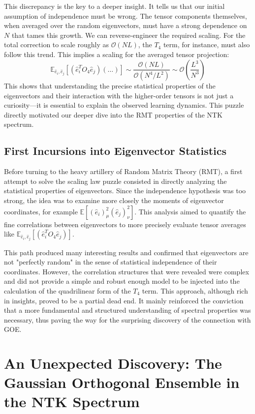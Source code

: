 \documentclass{article}
\newcommand{\Order}{\mathcal{O}}
\begin{document}
This discrepancy is the key to a deeper insight. It tells us that our initial assumption of independence must be wrong. The tensor components themselves, when averaged over the random eigenvectors, must have a strong dependence on $N$ that tames this growth. We can reverse-engineer the required scaling. For the total correction to scale roughly as $\Order(NL)$, the $T_4$ term, for instance, must also follow this trend. This implies a scaling for the averaged tensor projection:
\[ \mathbb{E}_{\hat{e}_i, \hat{e}_j}[(\hat{e}_{i}^{T}O_{4}\hat{e}_{j})(\dots)] \sim \frac{\Order(NL)}{\Order(N^4/L^2)} \sim \Order\left(\frac{L^3}{N^3}\right) \]
This shows that understanding the precise statistical properties of the eigenvectors and their interaction with the higher-order tensors is not just a curiosity—it is essential to explain the observed learning dynamics. This puzzle directly motivated our deeper dive into the RMT properties of the NTK spectrum.

\subsection{First Incursions into Eigenvector Statistics}

Before turning to the heavy artillery of Random Matrix Theory (RMT), a first attempt to solve the scaling law puzzle consisted in directly analyzing the statistical properties of eigenvectors. Since the independence hypothesis was too strong, the idea was to examine more closely the moments of eigenvector coordinates, for example $\mathbb{E}[(\hat{e}_i)_\mu^2 (\hat{e}_j)_\nu^2]$. This analysis aimed to quantify the fine correlations between eigenvectors to more precisely evaluate tensor averages like $\mathbb{E}_{\hat{e}_i, \hat{e}_j}[(\hat{e}_{i}^{T}O_{4}\hat{e}_{j})]$.

This path produced many interesting results and confirmed that eigenvectors are not "perfectly random" in the sense of statistical independence of their coordinates. However, the correlation structures that were revealed were complex and did not provide a simple and robust enough model to be injected into the calculation of the quadrilinear form of the $T_4$ term. This approach, although rich in insights, proved to be a partial dead end. It mainly reinforced the conviction that a more fundamental and structured understanding of spectral properties was necessary, thus paving the way for the surprising discovery of the connection with GOE.

\newpage
\section{An Unexpected Discovery: The Gaussian Orthogonal Ensemble in the NTK Spectrum}
\end{document}
